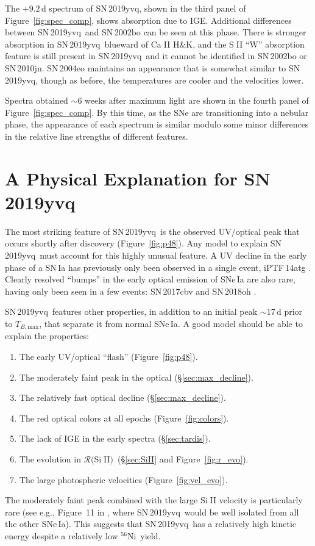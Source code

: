 \documentclass[twocolumn]{aastex63}
\def\ion#1#2{#1$\;${\footnotesize\rm{#2}}\relax}
\newcommand{\todo}[1]{{\color{magenta} to-do: {#1}}}
\newcommand{\tbmax}{$T_{B,\mathrm{max}}$}
\newcommand{\RSiII}{$\mathcal{R}($\ion{Si}{II}$)$}
\newcommand{\radni}{$^{56}$Ni}
\newcommand{\sn}{SN\,2019yvq}
\begin{document}
The $+9.2$\,d spectrum of \sn, shown in the third panel of
Figure~\ref{fig:spec_comp}, shows absorption due to IGE. Additional
differences between \sn\ and SN\,2002bo can be seen at this phase. There is
stronger absorption in \sn\ blueward of \ion{Ca}{II} H\&K, and the \ion{S}{II}
``W'' absorption feature is still present in \sn\ and it cannot be identified
in SN\,2002bo or SN\,2010jn. SN\,2004eo maintains an appearance that is
somewhat similar to \sn, though as before, the temperatures are cooler and the
velocities lower.

Spectra obtained $\sim$6 weeks after maximum light are shown in the fourth
panel of Figure~\ref{fig:spec_comp}. By this time, as the SNe are
transitioning into a nebular phase, the appearance of each spectrum is similar
modulo some minor differences in the relative line strengths of different
features.

\section{A Physical Explanation for \sn}\label{sec:models}

The most striking feature of \sn\ is the observed UV/optical peak that occurs
shortly after discovery (Figure~\ref{fig:p48}). Any model to explain \sn\ must
account for this highly unusual feature. A UV decline in the early phase of a
SN\,Ia has previously only been observed in a single event, iPTF\,14atg
\citep{Cao15}. Clearly resolved ``bumps'' in the early optical emission of
SNe\,Ia are also rare, having only been seen in a few events: SN\,2017cbv
\citep{Hosseinzadeh17} and SN\,2018oh \citep{Shappee19,Dimitriadis19}.

\sn\ features other properties, in addition to an initial peak $\sim$17\,d
prior to \tbmax, that separate it from normal SNe\,Ia. A good model should be
able to explain the properties:
%
\begin{enumerate}
    \item The early UV/optical ``flash'' (Figure~\ref{fig:p48}).
    \item The moderately faint peak in the optical (\S\ref{sec:max_decline}). 
    \item The relatively fast optical decline (\S\ref{sec:max_decline}). 
    \item The red optical colors at all epochs (Figure~\ref{fig:colors}). 
    \item The lack of IGE in the early spectra (\S\ref{sec:tardis}).
    \item The evolution in \RSiII\ (\S\ref{sec:SiII} and Figure~\ref{fig:r_evo}).
    \item The large photospheric velocities (Figure~\ref{fig:vel_evo}).
\end{enumerate}
%
The moderately faint peak combined with the large \ion{Si}{II} velocity is
particularly rare (see e.g., Figure~11 in \citealt{Polin19}, where \sn\ would
be well isolated from all the other SNe\,Ia). This suggests that \sn\ has a
relatively high kinetic energy despite a relatively low \radni\ yield.
\end{document}

